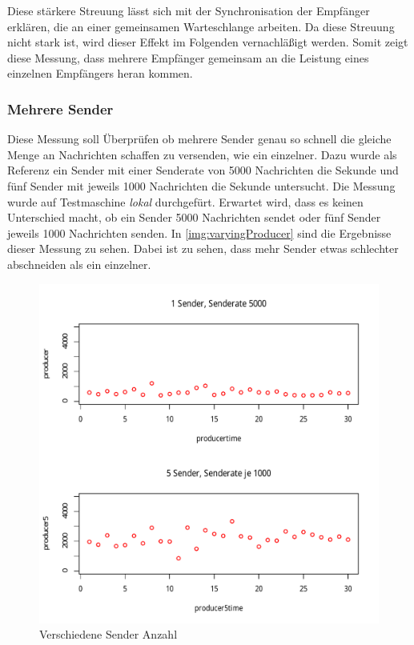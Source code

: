 Diese stärkere Streuung lässt sich mit der Synchronisation der Empfänger erklären, die an einer gemeinsamen Warteschlange arbeiten. Da diese Streuung nicht stark ist, wird dieser Effekt im Folgenden vernachläßigt werden. Somit zeigt diese Messung, dass mehrere Empfänger gemeinsam an die Leistung eines einzelnen Empfängers heran kommen. 

\subsubsection{Mehrere Sender}
Diese Messung soll Überprüfen ob mehrere Sender genau so schnell die gleiche Menge an Nachrichten schaffen zu versenden, wie ein einzelner. Dazu wurde als Referenz ein Sender mit einer Senderate von 5000 Nachrichten die Sekunde und fünf Sender mit jeweils 1000 Nachrichten die Sekunde untersucht. Die Messung wurde auf Testmaschine \textit{lokal} durchgefürt. Erwartet wird, dass es keinen Unterschied macht, ob ein Sender 5000 Nachrichten sendet oder fünf Sender jeweils 1000 Nachrichten senden. 
In \autoref{img:varyingProducer} sind die Ergebnisse dieser Messung zu sehen. Dabei ist zu sehen, dass mehr Sender etwas schlechter abschneiden als ein einzelner. 
\begin{figure}
\center
  \includegraphics[width=1\textwidth]{images/measurement/varying-producer.pdf}
  \caption{Verschiedene Sender Anzahl}
  \label{img:varyingProducer}
\end{figure}
